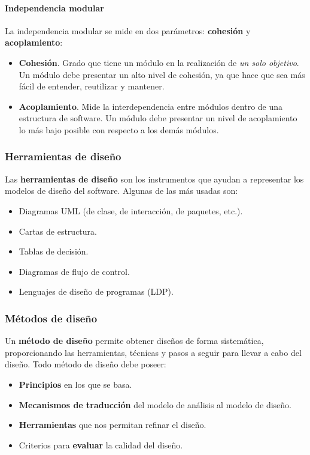 \documentclass[12pt,spanish]{article}
\begin{document}
\paragraph{Independencia modular\\}

La independencia modular se mide en dos parámetros: \textbf{cohesión} y \textbf{acoplamiento}:

\begin{itemize}
	\item \textbf{Cohesión}. Grado que tiene un módulo en la realización de \emph{un solo objetivo}. Un módulo debe presentar un alto nivel de cohesión, ya que hace que sea más fácil de entender, reutilizar y mantener.
	\item \textbf{Acoplamiento}. Mide la interdependencia entre módulos dentro de una estructura de software. Un módulo debe presentar un nivel de acoplamiento lo más bajo posible con respecto a los demás módulos. 
\end{itemize}

\subsubsection{Herramientas de diseño}

Las \textbf{herramientas de diseño} son los instrumentos que ayudan a representar los modelos de diseño del software. Algunas de las más usadas son:
\begin{itemize}
	\item Diagramas UML (de clase, de interacción, de paquetes, etc.).
	\item Cartas de estructura.
	\item Tablas de decisión.
	\item Diagramas de flujo de control.
	\item Lenguajes de diseño de programas (LDP).
\end{itemize}
\newpage
\subsubsection{Métodos de diseño}

Un \textbf{método de diseño} permite obtener diseños de forma sistemática, proporcionando las herramientas, técnicas y pasos a seguir para llevar a cabo del diseño. Todo método de diseño debe poseer:
\begin{itemize}
	\item \textbf{Principios} en los que se basa.
	\item \textbf{Mecanismos de traducción} del modelo de análisis al modelo de diseño.
	\item \textbf{Herramientas} que nos permitan refinar el diseño.
	\item Criterios para \textbf{evaluar} la calidad del diseño.
\end{itemize}
\end{document}
